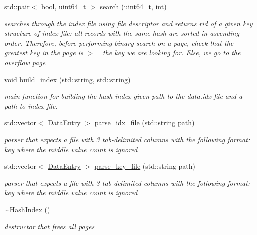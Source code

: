 \begin{DoxyCompactItemize}
\item 
std\+::pair$<$ bool, uint64\+\_\+t $>$ \hyperlink{class_hash_index_a247ba4d9ac11792be1853eec5593ac1a}{search} (uint64\+\_\+t, int)
\begin{DoxyCompactList}\small\item\em searches through the index file using file descriptor and returns rid of a given key structure of index file\+: all records with the same hash are sorted in ascending order. Therefore, before performing binary search on a page, check that the greatest key in the page is $>$= the key we are looking for. Else, we go to the overflow page \end{DoxyCompactList}\item 
void \hyperlink{class_hash_index_a7d704988a35e8703feeefd9f2a5e68c8}{build\+\_\+index} (std\+::string, std\+::string)
\begin{DoxyCompactList}\small\item\em main function for building the hash index given path to the data.\+idx file and a path to index file. \end{DoxyCompactList}\item 
std\+::vector$<$ \hyperlink{class_data_entry}{Data\+Entry} $>$ \hyperlink{class_hash_index_af1027d9d3684c93abcc703ccd1824937}{parse\+\_\+idx\+\_\+file} (std\+::string path)
\begin{DoxyCompactList}\small\item\em parser that expects a file with 3 tab-\/delimited columns with the following format\+: key where the middle value count is ignored \end{DoxyCompactList}\item 
std\+::vector$<$ \hyperlink{class_data_entry}{Data\+Entry} $>$ \hyperlink{class_hash_index_a7b1b1f9d1cd6cec6cae120b338287526}{parse\+\_\+key\+\_\+file} (std\+::string path)
\begin{DoxyCompactList}\small\item\em parser that expects a file with 3 tab-\/delimited columns with the following format\+: key where the middle value count is ignored \end{DoxyCompactList}\item 
\hypertarget{class_hash_index_af8de8c5d009e19dc923f82e5e6cb4ae3}{}\hyperlink{class_hash_index_af8de8c5d009e19dc923f82e5e6cb4ae3}{$\sim$\+Hash\+Index} ()\label{class_hash_index_af8de8c5d009e19dc923f82e5e6cb4ae3}

\begin{DoxyCompactList}\small\item\em destructor that frees all pages \end{DoxyCompactList}\end{DoxyCompactItemize}
